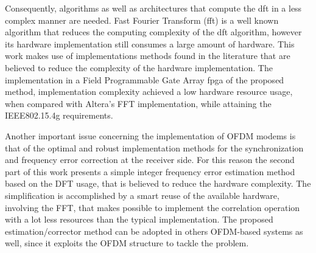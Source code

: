  
Consequently, algorithms as well as architectures that compute the \ac{dft} in a less complex manner are needed. Fast Fourier Transform (\ac{fft}) is a well known algorithm that reduces the computing complexity of the \ac{dft} algorithm, however its hardware implementation still consumes a large amount of hardware. This work makes use of 
implementations methods found in the literature that are believed to reduce the complexity of the hardware implementation. The implementation in a Field Programmable Gate Array \ac{fpga} of the proposed method, implementation complexity achieved a low hardware resource usage, when compared with Altera's FFT implementation, while attaining the IEEE802.15.4g requirements. 




Another important issue concerning the implementation of OFDM modems is that of the optimal and robust implementation methods for the synchronization and frequency error correction at the receiver side. For this reason the second part of this work presents a simple integer frequency error estimation method based on the DFT usage, that is believed to reduce the hardware complexity. The simplification is accomplished by a smart reuse of the available hardware, involving the FFT, that makes possible to implement the correlation operation with a lot less resources than the typical implementation. The proposed estimation/corrector method can be adopted in others OFDM-based systems as well, since it exploits the OFDM structure to tackle the problem. 





